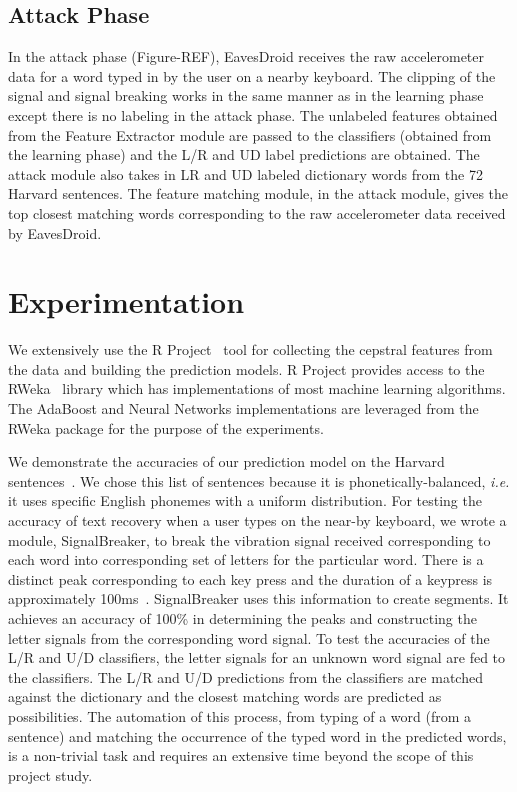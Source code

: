 \documentclass[11pt,conference]{IEEEtran}
\begin{document}
\subsection{Attack Phase}
\label{sec:attacking}
\noindent In the attack phase (Figure-REF), EavesDroid receives the raw accelerometer data for a word
typed in by the user on a nearby keyboard. The clipping of the signal and signal breaking
works in the same manner as in the learning phase except there is no labeling in the attack
phase. The unlabeled features obtained from the Feature Extractor module are passed
to the classifiers (obtained from the learning phase) and the L/R and UD label predictions
are obtained. The attack module also takes in LR and UD labeled dictionary words from the
72 Harvard sentences. The feature matching module, in the attack module, gives the top
closest matching words corresponding to the raw accelerometer data received by EavesDroid.

\section{Experimentation}
\label{sec:experimentation}
\noindent We extensively use the R Project~\cite{r-project} tool for collecting the
cepstral features from the data and building the prediction models. R Project
provides access to the RWeka~\cite{rweka} library which has implementations
of most machine learning algorithms. The AdaBoost and Neural Networks implementations
are leveraged from the RWeka package for the purpose of the experiments.

We demonstrate the accuracies of our prediction model on the Harvard
sentences~\cite{harvard-sentences}. We chose this list of sentences because
it is phonetically-balanced, \emph{i.e.} it uses specific English phonemes
with a uniform distribution. For testing the accuracy of text recovery when
a user types on the near-by keyboard, we wrote a module, SignalBreaker, to break the vibration
signal received corresponding to each word into corresponding set of letters for
the particular word. There is a distinct peak corresponding to each key press and
the duration of a keypress is approximately 100ms~\cite{spiphone}. SignalBreaker
uses this information to create segments. It achieves an accuracy of 100\% in
determining the peaks and constructing the letter signals from the corresponding word
signal. To test the accuracies of the L/R and U/D classifiers, the letter signals
for an unknown word signal are fed to the classifiers. The L/R and U/D predictions
from the classifiers are matched against the dictionary and the closest matching
words are predicted as possibilities. The automation of this process, from typing
of a word (from a sentence) and matching the occurrence of the typed word in the
predicted words, is a non-trivial task and requires an extensive time beyond the scope
of this project study.
\end{document}
